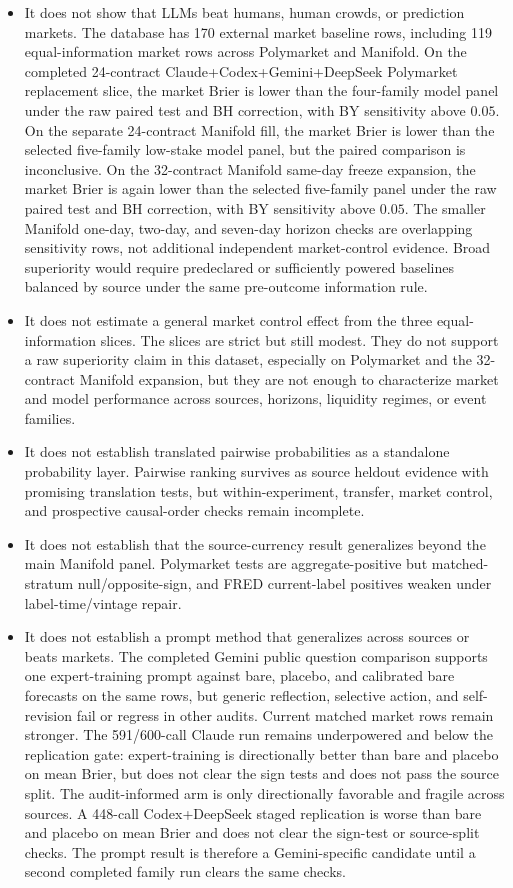 \documentclass[11pt]{article}
\begin{document}
\begin{itemize}[leftmargin=*]
\item It does not show that LLMs beat humans, human crowds, or prediction markets. The database has 170 external market baseline rows, including 119 equal-information market rows across Polymarket and Manifold. On the completed 24-contract Claude+Codex+Gemini+DeepSeek Polymarket replacement slice, the market Brier is lower than the four-family model panel under the raw paired test and BH correction, with BY sensitivity above \(0.05\). On the separate 24-contract Manifold fill, the market Brier is lower than the selected five-family low-stake model panel, but the paired comparison is inconclusive. On the 32-contract Manifold same-day freeze expansion, the market Brier is again lower than the selected five-family panel under the raw paired test and BH correction, with BY sensitivity above \(0.05\). The smaller Manifold one-day, two-day, and seven-day horizon checks are overlapping sensitivity rows, not additional independent market-control evidence. Broad superiority would require predeclared or sufficiently powered baselines balanced by source under the same pre-outcome information rule.
\item It does not estimate a general market control effect from the three equal-information slices. The slices are strict but still modest. They do not support a raw superiority claim in this dataset, especially on Polymarket and the 32-contract Manifold expansion, but they are not enough to characterize market and model performance across sources, horizons, liquidity regimes, or event families.
\item It does not establish translated pairwise probabilities as a standalone probability layer. Pairwise ranking survives as source heldout evidence with promising translation tests, but within-experiment, transfer, market control, and prospective causal-order checks remain incomplete.
\item It does not establish that the source-currency result generalizes beyond the main Manifold panel. Polymarket tests are aggregate-positive but matched-stratum null/opposite-sign, and FRED current-label positives weaken under label-time/vintage repair.
\item It does not establish a prompt method that generalizes across sources or beats markets. The completed Gemini public question comparison supports one expert-training prompt against bare, placebo, and calibrated bare forecasts on the same rows, but generic reflection, selective action, and self-revision fail or regress in other audits. Current matched market rows remain stronger. The 591/600-call Claude run remains underpowered and below the replication gate: expert-training is directionally better than bare and placebo on mean Brier, but does not clear the sign tests and does not pass the source split. The audit-informed arm is only directionally favorable and fragile across sources. A 448-call Codex+DeepSeek staged replication is worse than bare and placebo on mean Brier and does not clear the sign-test or source-split checks. The prompt result is therefore a Gemini-specific candidate until a second completed family run clears the same checks.

\end{itemize}
\end{document}
